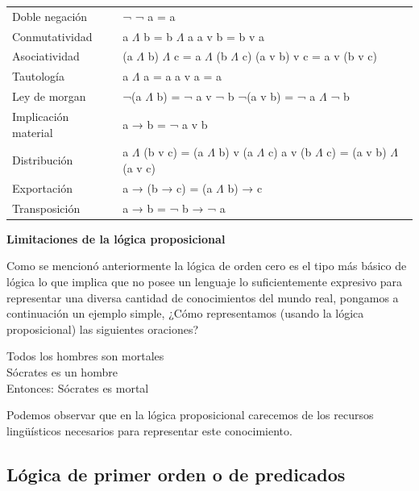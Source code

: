 \documentclass[11pt,fleqn]{book} %
\begin{document}
\begin{tabular}{|l|l|}
\hline
	\thead{Nombre} & \thead{Regla}\\
\hline
	Doble negación & ¬ ¬ a = a\\
\hline
	Conmutatividad & \makecell[l]{a $\Lambda$ b = b $\Lambda$ a \\ a v b = b v a}\\
\hline
	Asociatividad & \makecell[l]{(a $\Lambda$ b) $\Lambda$ c = a $\Lambda$ (b $\Lambda$ c)\\ (a v b) v c = a v (b v c)}\\
\hline
	Tautología & \makecell[l]{a $\Lambda$ a = a \\ a v a = a}\\
\hline
	Ley de morgan & \makecell[l]{¬(a $\Lambda$ b) = ¬ a v ¬ b \\ ¬(a v b) = ¬ a $\Lambda$ ¬ b}\\
\hline
	Implicación material & a → b = ¬ a v b\\
\hline
	Distribución & \makecell[l]{a $\Lambda$ (b v c) = (a $\Lambda$ b) v (a $\Lambda$ c) \\ a v (b $\Lambda$ c) = (a v b) $\Lambda$ (a v c)}\\
\hline
	Exportación & a → (b → c) = (a $\Lambda$ b) → c\\
\hline
	Transposición & a → b = ¬ b → ¬ a\\
\hline
\end{tabular}

\textbf{Limitaciones de la lógica proposicional}

Como se mencionó anteriormente la lógica de orden cero es el tipo más básico de lógica lo que implica que no posee un lenguaje lo suficientemente expresivo para representar una diversa cantidad de conocimientos del mundo real, pongamos a continuación un ejemplo simple, ¿Cómo representamos (usando la lógica proposicional) las siguientes oraciones?

Todos los hombres son mortales\\
Sócrates es un hombre\\
Entonces: Sócrates es mortal

Podemos observar que en la lógica proposicional carecemos de los recursos lingüísticos necesarios para representar este conocimiento.

\subsection{Lógica de primer orden o de predicados} 
\end{document}
